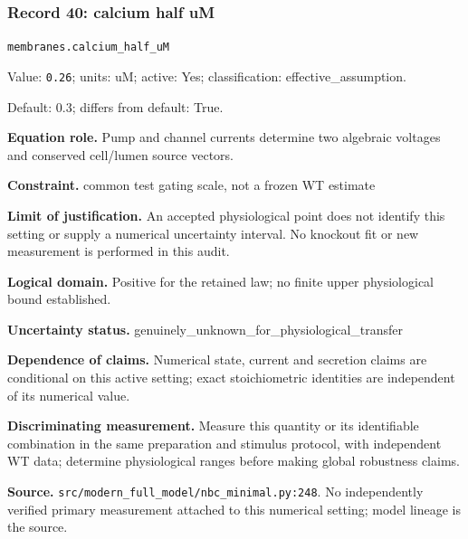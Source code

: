 \subsubsection*{Record 40: calcium half uM}
{\small \nolinkurl{membranes.calcium_half_uM}\par

Value: \texttt{0.26}; units: uM; active: Yes; classification: effective\_assumption.\par

Default: 0.3; differs from default: True.\par

\textbf{Equation role.} Pump and channel currents determine two algebraic voltages and conserved cell/lumen source vectors.\par

\textbf{Constraint.} common test gating scale, not a frozen WT estimate\par

\textbf{Limit of justification.} An accepted physiological point does not identify this setting or supply a numerical uncertainty interval. No knockout fit or new measurement is performed in this audit.\par

\textbf{Logical domain.} Positive for the retained law; no finite upper physiological bound established.\par

\textbf{Uncertainty status.} genuinely\_unknown\_for\_physiological\_transfer\par

\textbf{Dependence of claims.} Numerical state, current and secretion claims are conditional on this active setting; exact stoichiometric identities are independent of its numerical value.\par

\textbf{Discriminating measurement.} Measure this quantity or its identifiable combination in the same preparation and stimulus protocol, with independent WT data; determine physiological ranges before making global robustness claims.\par

\textbf{Source.} \nolinkurl{src/modern_full_model/nbc_minimal.py:248}. No independently verified primary measurement attached to this numerical setting; model lineage is the source.\par}

